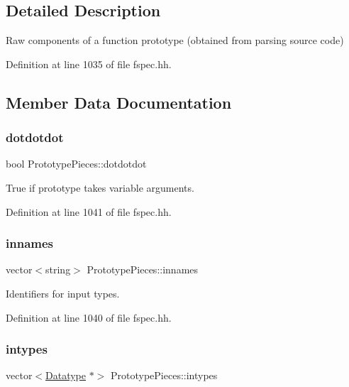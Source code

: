 \subsection{Detailed Description}
Raw components of a function prototype (obtained from parsing source code) 

Definition at line 1035 of file fspec.\+hh.



\subsection{Member Data Documentation}
\mbox{\label{struct_prototype_pieces_a06df4f0bbd4f67847962c3ae35e8945d}} 
\subsubsection{\texorpdfstring{dotdotdot}{dotdotdot}}
{\footnotesize\ttfamily bool Prototype\+Pieces\+::dotdotdot}



True if prototype takes variable arguments. 



Definition at line 1041 of file fspec.\+hh.

\mbox{\label{struct_prototype_pieces_ab424fb1bcab5c7d008b590a24a3ad34e}} 
\subsubsection{\texorpdfstring{innames}{innames}}
{\footnotesize\ttfamily vector$<$string$>$ Prototype\+Pieces\+::innames}



Identifiers for input types. 



Definition at line 1040 of file fspec.\+hh.

\mbox{\label{struct_prototype_pieces_aca89ccc6fb7ef4527613909e341efe64}} 
\subsubsection{\texorpdfstring{intypes}{intypes}}
{\footnotesize\ttfamily vector$<$\mbox{\hyperlink{class_datatype}{Datatype}} $\ast$$>$ Prototype\+Pieces\+::intypes}



